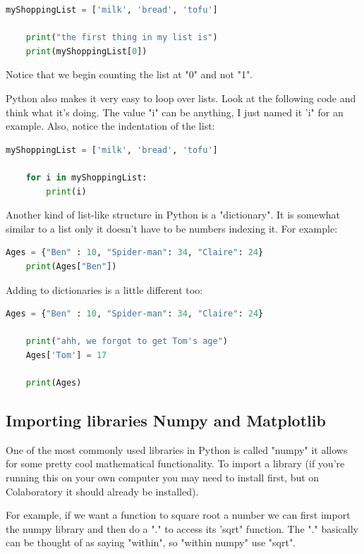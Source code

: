 \documentclass[12pt]{article}
\begin{document}
\begin{lstlisting}[language=Python]
    myShoppingList = ['milk', 'bread', 'tofu']

    print("the first thing in my list is")
    print(myShoppingList[0])

\end{lstlisting}

Notice that we begin counting the list at "0" and not "1". 

Python also makes it very easy to loop over lists. Look at the following code and think what it's doing. The value "i" can be anything, I just named it 'i" for an example. Also, notice the indentation of the list:

\begin{lstlisting}[language=Python]
    myShoppingList = ['milk', 'bread', 'tofu']

    for i in myShoppingList:
        print(i)

\end{lstlisting}

Another kind of list-like structure in Python is a "dictionary". It is somewhat similar to a list only it doesn't have to be numbers indexing it. For example: 

\begin{lstlisting}[language=Python]
    Ages = {"Ben" : 10, "Spider-man": 34, "Claire": 24}
    print(Ages["Ben"])
\end{lstlisting}

Adding to dictionaries is a little different too:

\begin{lstlisting}[language=Python]
    Ages = {"Ben" : 10, "Spider-man": 34, "Claire": 24}

    print("ahh, we forgot to get Tom's age")
    Ages['Tom'] = 17

    print(Ages)
\end{lstlisting}

\subsection{Importing libraries Numpy and Matplotlib}

One of the most commonly used libraries in Python is called "numpy" it allows for some pretty cool mathematical functionality. To import a library (if you're running this on your own computer you may need to install first, but on Colaboratory it should already be installed). 

For example, if we want a function to square root a number we can first import the numpy library and then do a "." to access its 'sqrt" function. The "." basically can be thought of as saying "within", so "within numpy" use "sqrt". 
\end{document}
